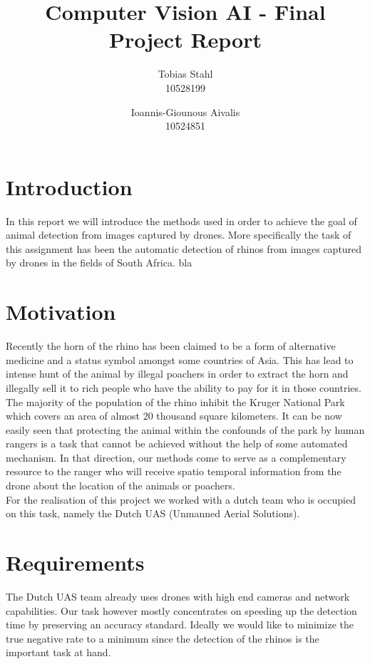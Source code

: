\documentclass[11pt]{article}
\title{
	\textbf{Computer Vision AI - Final Project Report}
}
\author{Tobias Stahl \\ 10528199 \and Ioannis-Giounous Aivalis \\ 10524851}
\begin{document}
\maketitle

\section{Introduction}
In this report we will introduce the methods used in order to achieve  the goal of animal detection from images captured by drones. More specifically the task of this assignment has been the automatic detection of rhinos from images captured by drones in the fields of South Africa.
bla \cite{Sochman07learninga}

\section{Motivation}
Recently the horn of the rhino has been claimed to be a form of alternative medicine and a status symbol amongst some countries of Asia. This has lead to intense hunt of the animal by illegal poachers in order to extract the horn and illegally sell it to rich people who have the ability to pay for it in those countries.\\
The majority of the population of the rhino inhibit the Kruger National Park which covers an area of almost 20 thousand square kilometers. It can be now easily seen that protecting the animal within the confounds of the park by human rangers is a task that cannot be achieved without the help of some automated mechanism. In that direction, our methods come to serve as a complementary resource to the ranger who will receive spatio temporal information from the drone about the location of the animals or poachers.\\
For the realisation of this project we worked with a dutch team who is occupied on this task, namely the Dutch UAS (Unmanned Aerial Solutions).

\section{Requirements}
The Dutch UAS team already uses drones with high end cameras and network capabilities. Our task however mostly concentrates on speeding up the detection time by preserving an accuracy standard. Ideally we would like to minimize the true negative rate to a minimum since the detection of the rhinos is the important task at hand. 
\end{document}
